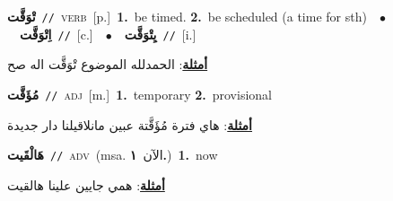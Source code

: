 \documentclass[10pt,a4paper,twoside]{article} %
\begin{document}
\begin{multicols}{2}
{\setlength\topsep{0pt}\textbf{\foreignlanguage{arabic}{تْوَقَّت}}\ {\color{gray}\texttt{//}\color{black}}\ \textsc{verb}\ [p.]\ \textbf{1.}~be timed.  \textbf{2.}~be scheduled (a time for sth)\ \ $\bullet$\ \ \setlength\topsep{0pt}\textbf{\foreignlanguage{arabic}{اِتْوَقَّت}}\ {\color{gray}\texttt{//}\color{black}}\ [c.]\ \ $\bullet$\ \ \setlength\topsep{0pt}\textbf{\foreignlanguage{arabic}{يِتْوَقَّت}}\ {\color{gray}\texttt{//}\color{black}}\ [i.]\  \begin{flushright}\color{gray}\foreignlanguage{arabic}{\textbf{\underline{\foreignlanguage{arabic}{أمثلة}}}: الحمدلله الموضوع تْوَقَّت اله صح}\end{flushright}\color{black}} \vspace{2mm}

{\setlength\topsep{0pt}\textbf{\foreignlanguage{arabic}{مُؤَقَّت}}\ {\color{gray}\texttt{//}\color{black}}\ \textsc{adj}\ [m.]\ \textbf{1.}~temporary  \textbf{2.}~provisional\  \begin{flushright}\color{gray}\foreignlanguage{arabic}{\textbf{\underline{\foreignlanguage{arabic}{أمثلة}}}: هاي فترة مُؤَقَّتة عبين مانلاقيلنا دار جديدة}\end{flushright}\color{black}} \vspace{2mm}

{\setlength\topsep{0pt}\textbf{\foreignlanguage{arabic}{هَالْقَيت}}\ {\color{gray}\texttt{//}\color{black}}\ \textsc{adv}\ \color{gray}(msa. \foreignlanguage{arabic}{الآن}~\foreignlanguage{arabic}{\textbf{١.}})\color{black}\ \textbf{1.}~now\  \begin{flushright}\color{gray}\foreignlanguage{arabic}{\textbf{\underline{\foreignlanguage{arabic}{أمثلة}}}: همي جايين علينا هالقيت}\end{flushright}\color{black}} \vspace{2mm}


\end{multicols}
\end{document}
